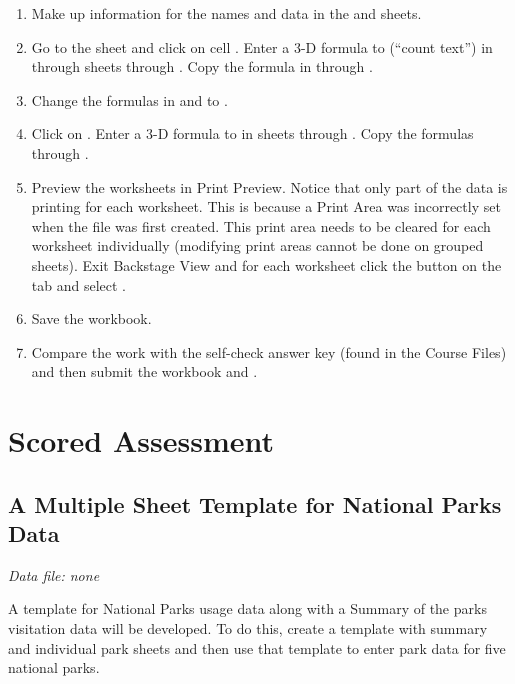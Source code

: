 \begin{enumerate}
	\item Make up information for the names and data in the  and  sheets.
	\item Go to the  sheet and click on cell . Enter a 3-D formula to  (``count text'') in  through sheets  through . Copy the formula in  through .
	\item Change the formulas in  and  to .
	\item Click on . Enter a 3-D formula to  in sheets  through . Copy the formulas through .
	\item Preview the worksheets in Print Preview. Notice that only part of the data is printing for each worksheet. This is because a Print Area was incorrectly set when the file was first created. This print area needs to be cleared for each worksheet individually (modifying print areas cannot be done on grouped sheets). Exit Backstage View and for each worksheet click the  button on the  tab and select .
	\item Save the  workbook.
	\item Compare the work with the self-check answer key (found in the Course Files) and then submit the  workbook and .
\end{enumerate}

\section{Scored Assessment}

\subsection{A Multiple Sheet Template for National Parks Data}

\textit{Data file: none}

A template for National Parks usage data along with a Summary of the parks visitation data will be developed. To do this, create a template with summary and individual park sheets and then use that template to enter park data for five national parks.

